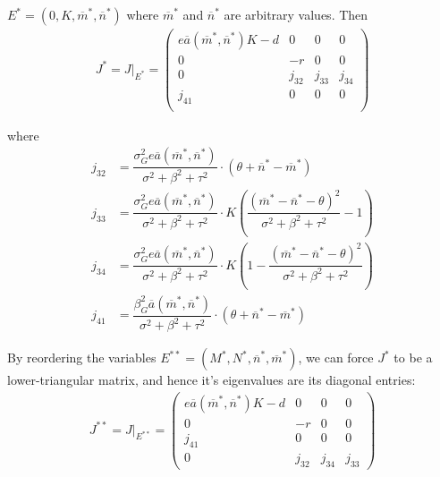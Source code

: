 \documentclass[10pt]{beamer}
\begin{document}
$E^* = (0, K, \overline{m}^*, \overline{n}^*)$ where $\overline{m}^*$ and $\overline{n}^*$ are arbitrary values.  Then
\begin{align*}
	J^* = J\big|_{E^*} = \left(
	\begin{array}{cccc}
		e\overline{a}(\overline{m}^*, \overline{n}^*)K - d & 0 & 0 & 0 \\[.4cm]
		0 & -r & 0 & 0 \\[.4cm]
		0 & j_{32} & j_{33} & j_{34} \\[.4cm]
		j_{41} & 0 & 0 & 0 \\
	\end{array}
	\right)
\end{align*}

\noindent where
\begin{align*}
	j_{32} &= \dfrac{\sigma_G^2e\overline{a}(\overline{m}^*, \overline{n}^*)}{\sigma^2 + \beta^2 + \tau^2} \cdot (\theta + \overline{n}^* - \overline{m}^*) \\
	j_{33} &=  \dfrac{\sigma_G^2e\overline{a}(\overline{m}^*, \overline{n}^*)}{\sigma^2 + \beta^2 + \tau^2} \cdot K\left(\dfrac{(\overline{m}^* - \overline{n}^* - \theta)^2}{\sigma^2 + \beta^2 + \tau^2} - 1\right) \\
	j_{34} &= \dfrac{\sigma_G^2e\overline{a}(\overline{m}^*, \overline{n}^*)}{\sigma^2 + \beta^2 + \tau^2} \cdot K\left(1 - \dfrac{(\overline{m}^* - \overline{n}^* - \theta)^2}{\sigma^2 + \beta^2 + \tau^2}\right) \\
	j_{41} &= \dfrac{\beta_G^2\overline{a}(\overline{m}^*, \overline{n}^*)}{\sigma^2 + \beta^2 + \tau^2} \cdot (\theta + \overline{n}^* - \overline{m}^*)
\end{align*}

\vskip 10pt

\noindent By reordering the variables $E^{**} = (M^*, N^*, \overline{n}^*, \overline{m}^*)$, we can force $J^*$ to be a lower-triangular matrix, and hence it's eigenvalues are its diagonal entries:
\begin{align*}
	J^{**} = J\big|_{E^{**}} = \left(
	\begin{array}{cccc}
		e\overline{a}(\overline{m}^*, \overline{n}^*)K - d & 0 & 0 & 0 \\[.4cm]
		0 & -r & 0 & 0 \\[.4cm]
		j_{41} & 0 & 0 & 0 \\[.4cm]
		0 & j_{32} & j_{34} & j_{33}
	\end{array}
	\right)
\end{align*}
\end{document}
